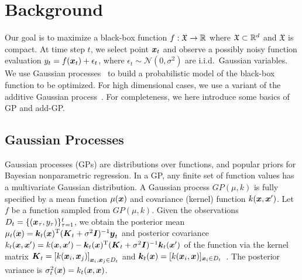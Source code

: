\section{Background}
Our goal is to maximize a black-box function $f:\mathfrak X\rightarrow \mathbb{R}$ where $\mathfrak X \subset \mathbb{R}^{d}$ %
and $\mathfrak X$ is compact. At time step $t$, we select point ${\boldsymbol{x}}_t$ and observe a possibly noisy function evaluation $y_t=f({\boldsymbol{x}}_t)+\epsilon_t$, where $\epsilon_t \sim \mathcal N(0,\sigma^2)$ are i.i.d.\ Gaussian variables. %
 We use Gaussian processes~\cite{rasmussen2006gaussian} to build a probabilistic model of the black-box function to be optimized. For high dimensional cases, we use a variant of the additive Gaussian process~\cite{duvenaud2011additive,kandasamy2015high}. For completeness, we here introduce some basics of GP and add-GP.  %

\subsection{Gaussian Processes}
\label{ssec:gp}
Gaussian processes (GPs) are distributions over functions, and popular priors for Bayesian nonparametric regression.
In a GP, any finite set of function values has a multivariate Gaussian distribution. A Gaussian process $GP(\mu,k)$ is fully specified by a mean function $\mu({\boldsymbol{x}})$ and covariance (kernel) function $k({\boldsymbol{x}},{\boldsymbol{x}}')$. 
%
%
%
%
Let $f$ be a function sampled from $GP(\mu,k)$. %
Given the observations $D_t=\{({\boldsymbol{x}}_\tau,y_\tau)\}_{\tau=1}^{t}$, we obtain the posterior mean 
$\mu_{t}({\boldsymbol{x}}) = \boldsymbol{k}_t({\boldsymbol{x}})^{\textrm T}(\boldsymbol{K}_t+\sigma^2\boldsymbol{I})^{-1}\boldsymbol{y}_t$
and posterior covariance 
$k_{t}({\boldsymbol{x}},{\boldsymbol{x}}') = k({\boldsymbol{x}},{\boldsymbol{x}}') - \boldsymbol{k}_t({\boldsymbol{x}})^{\textrm T}(\boldsymbol{K}_t+\sigma^2\boldsymbol{I})^{-1} \boldsymbol{k}_t({\boldsymbol{x}}')$
of the function via the kernel matrix $\boldsymbol{K}_t =\left[k({\boldsymbol{x}}_i,{\boldsymbol{x}}_j)\right]_{{\boldsymbol{x}}_i,{\boldsymbol{x}}_j\in D_t}$ and $\boldsymbol{k}_t({\boldsymbol{x}}) = [k({\boldsymbol{x}}_i,{\boldsymbol{x}})]_{{\boldsymbol{x}}_i\in D_t}$~\citep{rasmussen2006gaussian}.
The posterior variance is $\sigma^2_{t}({\boldsymbol{x}}) = k_t({\boldsymbol{x}},{\boldsymbol{x}})$. %
%

